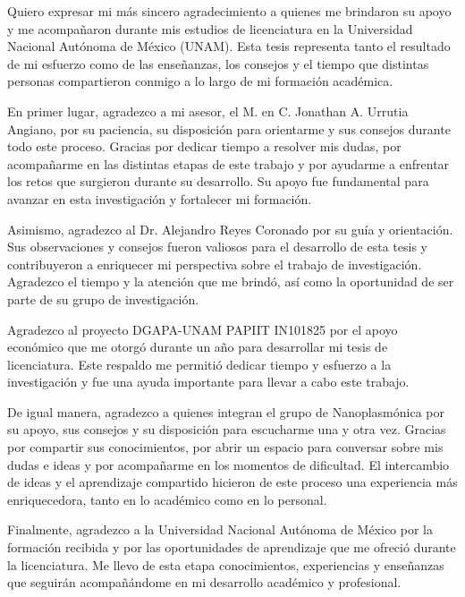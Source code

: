 
\begin{acknowledgements}

Quiero expresar mi más sincero agradecimiento a quienes me brindaron su apoyo y me acompañaron durante mis estudios de licenciatura en la Universidad Nacional Autónoma de México (UNAM). Esta tesis representa tanto el resultado de mi esfuerzo como de las enseñanzas, los consejos y el tiempo que distintas personas compartieron conmigo a lo largo de mi formación académica.

En primer lugar, agradezco a mi asesor, el M. en C. Jonathan A. Urrutia Angiano, por su paciencia, su disposición para orientarme y sus consejos durante todo este proceso. Gracias por dedicar tiempo a resolver mis dudas, por acompañarme en las distintas etapas de este trabajo y por ayudarme a enfrentar los retos que surgieron durante su desarrollo. Su apoyo fue fundamental para avanzar en esta investigación y fortalecer mi formación.

Asimismo, agradezco al Dr. Alejandro Reyes Coronado por su guía y orientación. Sus observaciones y consejos fueron valiosos para el desarrollo de esta tesis y contribuyeron a enriquecer mi perspectiva sobre el trabajo de investigación. Agradezco el tiempo y la atención que me brindó, así como la oportunidad de ser parte de su grupo de investigación.

Agradezco al proyecto DGAPA-UNAM PAPIIT IN101825 por el apoyo económico que me otorgó durante un año para desarrollar mi tesis de licenciatura. Este respaldo me permitió dedicar tiempo y esfuerzo a la investigación y fue una ayuda importante para llevar a cabo este trabajo.

De igual manera, agradezco a quienes integran el grupo de Nanoplasmónica por su apoyo, sus consejos y su disposición para escucharme una y otra vez. Gracias por compartir sus conocimientos, por abrir un espacio para conversar sobre mis dudas e ideas y por acompañarme en los momentos de dificultad. El intercambio de ideas y el aprendizaje compartido hicieron de este proceso una experiencia más enriquecedora, tanto en lo académico como en lo personal.

Finalmente, agradezco a la Universidad Nacional Autónoma de México por la formación recibida y por las oportunidades de aprendizaje que me ofreció durante la licenciatura. Me llevo de esta etapa conocimientos, experiencias y enseñanzas que seguirán acompañándome en mi desarrollo académico y profesional.


\end{acknowledgements}
